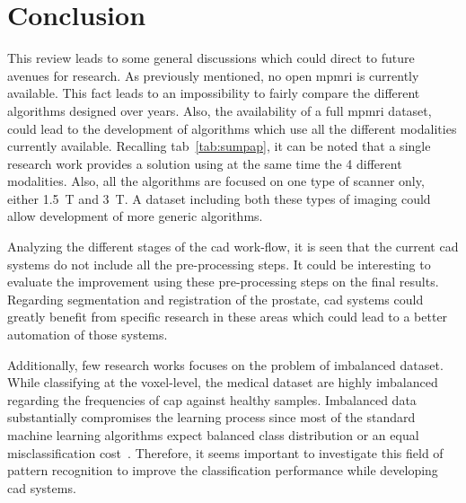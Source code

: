 \section{Conclusion}\label{subsec:chp3:dis:gen-dis}

This review leads to some general discussions which could direct to future
avenues for research.
As previously mentioned, no open \ac{mpmri} is currently available.
This fact leads to an impossibility to fairly compare the different algorithms
designed over years.
Also, the availability of a full \ac{mpmri} dataset, could lead to the
development of algorithms which use all the different modalities currently
available.
Recalling \acs{tab}~\ref{tab:sumpap}, it can be noted that a single research
work provides a solution using at the same time the 4 different modalities.
Also, all the algorithms are focused on one type of scanner only, either
\SI{1.5}{\tesla} and \SI{3}{\tesla}.
A dataset including both these types of imaging could allow development of more
generic algorithms.

Analyzing the different stages of the \ac{cad} work-flow, it is seen that the
current \ac{cad} systems do not include all the pre-processing steps.
It could be interesting to evaluate the improvement using these pre-processing
steps on the final results.
Regarding segmentation and registration of the prostate, \ac{cad} systems could
greatly benefit from specific research in these areas which could lead to a
better automation of those systems.

Additionally, few research works focuses on the problem of imbalanced dataset.
While classifying at the voxel-level, the medical dataset are highly imbalanced
regarding the frequencies of \ac{cap} against healthy samples.
Imbalanced data substantially compromises the learning process since most of
the standard machine learning algorithms expect balanced class distribution or
an equal misclassification cost~\cite{he2009learning}.
Therefore, it seems important to investigate this field of pattern recognition
to improve the classification performance while developing \ac{cad} systems.

